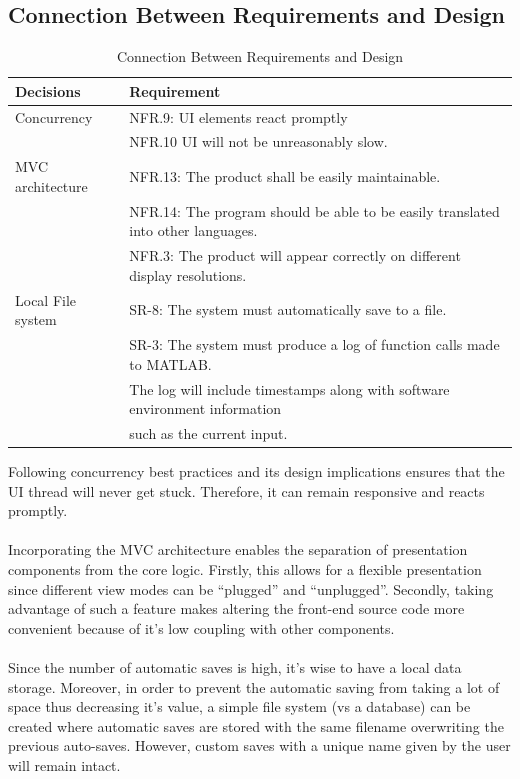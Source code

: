 \documentclass[12pt, titlepage]{article}
\begin{document}
\subsection{Connection Between Requirements and Design} 
\begin{table}[hp]
\caption{Connection Between Requirements and Design}
\label{TblRequirementsDesign}
\begin{tabular}{|l|l|}
\hline
Decisions & Requirement \\
\hline
Concurrency & NFR.9: UI elements react promptly\\ & NFR.10 UI will not be unreasonably slow.\\
\hline
MVC architecture & NFR.13: The product shall be easily maintainable.\\ & NFR.14: The program should be able to be easily translated into other languages. \\ & NFR.3: The product will appear correctly on different display resolutions.\\
\hline
Local File system & SR-8: The system must automatically save to a file.\\ & SR-3: The system must produce a log of function calls made to MATLAB.\\ & The log will include timestamps along with software environment information\\ & such as the current input.\\
\hline
\end{tabular}
\end{table}
Following concurrency best practices and its design implications ensures that the UI thread will never get stuck. Therefore, it can remain responsive and reacts promptly.\\\\
Incorporating the MVC architecture enables the separation of presentation components from the core logic. Firstly, this allows for a flexible presentation since different view modes can be “plugged” and “unplugged”. Secondly, taking advantage of such a feature makes altering the front-end source code more convenient because of it’s low coupling with other components.\\\\
Since the number of automatic saves is high, it’s wise to have a local data storage. Moreover, in order to prevent the automatic saving from taking a lot of space thus decreasing it’s value, a simple file system (vs a database) can be created where automatic saves are stored with the same filename overwriting the previous auto-saves. However, custom saves with a unique name given by the user will remain intact.  
\end{document}
